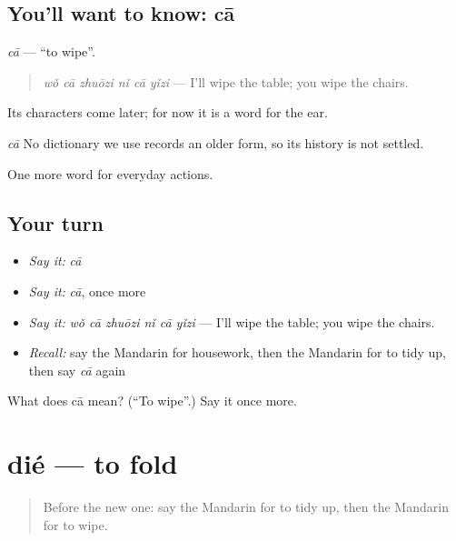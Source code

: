 \subsection*{You'll want to know: cā}
\emph{cā} — \textquotedblleft{}to wipe\textquotedblright{}.

\begin{quote}
\emph{wǒ cā zhuōzi nǐ cā yǐzi} — I'll wipe the table; you wipe the chairs.
\end{quote}

Its characters come later; for now it is a word for the ear.

\begin{cousinweb}
\emph{cā} No dictionary we use records an older form, so its history is not settled.
\end{cousinweb}

\begin{grammarlens}[title={What you've built}]
One more word for everyday actions.
\end{grammarlens}

\subsection*{Your turn}
\begin{itemize}
\raggedright
  \item \emph{Say it:} \emph{cā}
  \item \emph{Say it:} \emph{cā}, once more
  \item \emph{Say it:} \emph{wǒ cā zhuōzi nǐ cā yǐzi} — I'll wipe the table; you wipe the chairs.
  \item \emph{Recall:} say the Mandarin for housework, then the Mandarin for to tidy up, then say \emph{cā} again
\end{itemize}

\begin{tcolorbox}[breakable,colback=teal!4,colframe=teal!35!black,title={Before you move on}]
What does cā mean? (\textquotedblleft{}To wipe\textquotedblright{}.) Say it once more.
\end{tcolorbox}
\section[dié]{dié — to fold}

\label{lesson:ZH-C133-die}



\begin{quote}
Before the new one: say the Mandarin for to tidy up, then the Mandarin for to wipe.
\end{quote}

